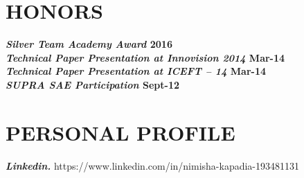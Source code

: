 \documentclass[line, margin]{res}
\begin{document}
\begin{resume}
\section{HONORS}
\textbf{\textit{Silver Team Academy Award} \hfill 2016} \\ 
\textbf{\textit{Technical Paper Presentation at Innovision 2014} \hfill Mar-14} \\ 
\textbf{\textit{Technical Paper Presentation at ICEFT – 14} \hfill Mar-14} \\ 
\textbf{\textit{SUPRA SAE Participation} \hfill Sept-12} \\ 
\section{PERSONAL PROFILE}

\textbf{\textit{Linkedin.}} https://www.linkedin.com/in/nimisha-kapadia-193481131 \\
\end{resume}
\end{document}
